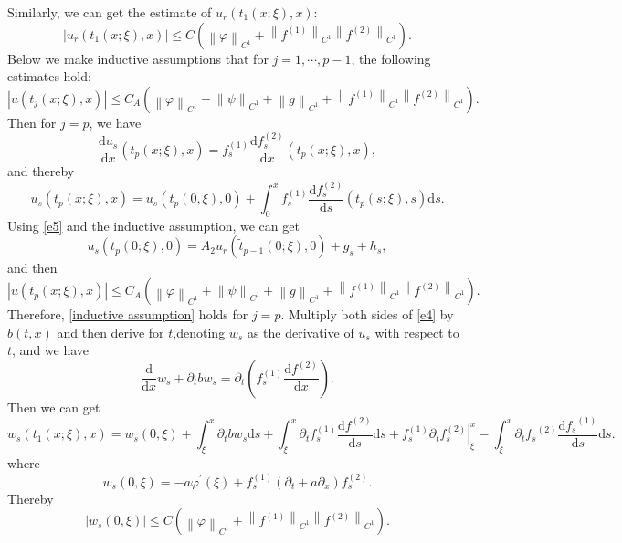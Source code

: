 \documentclass[a4paper,reqno,11pt]{amsart}
\numberwithin{equation}{section} %
\begin{document}
Similarly, we can get the estimate of $u_r\left( t_1(x;\xi ),x \right) $:
$$
\left| u_r\left( t_1(x;\xi ),x \right) \right|\leq C\left( \left\| \varphi \right\| _{C^1}+\left\| f^{(1)} \right\| _{C^1}\left\| f^{(2)} \right\| _{C^1} \right) .
$$
Below we make inductive assumptions that for $j=1,\cdots,p-1$, the following estimates hold:
\begin{equation}\label{inductive assumption}
\left| u\left( t_j(x;\xi ),x \right) \right|\leq C_A\left( \left\| \varphi \right\| _{C^1}+\left\| \psi \right\| _{C^1}+\left\| g \right\| _{C^1}+\left\| f^{(1)} \right\| _{C^1}\left\| f^{(2)} \right\| _{C^1} \right) .
\end{equation}
Then for $j=p$, we have
$$
\frac{\mathrm{d}u_s}{\mathrm{d}x}\left( t_p(x;\xi ),x \right) =f_{s}^{(1)}\frac{\mathrm{d}f_{s}^{(2)}}{\mathrm{d}x}\left( t_p(x;\xi ),x \right) ,
$$
and thereby
$$
u_s\left( t_p\left( x;\xi \right) ,x \right) =u_s(t_p(0,\xi ),0)+\int_{0}^x{f_{s}^{(1)}\frac{\mathrm{d}f_{s}^{(2)}}{\mathrm{d}s}\left( t_p\left( s;\xi \right) ,s \right) \mathrm{d}s}.
$$
Using \eqref{e5} and the inductive assumption, we can get
$$
u_s\left(t_p(0 ; \xi), 0\right)=A_2 u_r\left(\tilde{t}_{p-1}(0 ; \xi), 0\right)+g_s+h_s ,
$$
and then
$$
\left| u\left( t_p(x;\xi ),x \right) \right|\leq C_A\left( \left\| \varphi \right\| _{C^1}+\left\| \psi \right\| _{C^1}+\left\| g \right\| _{C^1}+\left\| f^{(1)} \right\| _{C^1}\left\| f^{(2)} \right\| _{C^1} \right) .
$$
Therefore, \eqref{inductive assumption} holds for $j=p$.
Multiply both sides of \eqref{e4} by $b(t,x)$ and then derive for $t$,denoting $w_s$ as the derivative of $u_s$ with respect to $t$, and we have
$$
\frac{\mathrm{d}}{\mathrm{d}x}w_s+\partial _tbw_s=\partial _t\left( f_{s}^{(1)}\frac{\mathrm{d}f^{(2)}}{\mathrm{d}x} \right). 
$$
Then we can get
\begin{equation}\label{e of w_s 1}
w_s\left( t_1(x;\xi ),x \right) =w_s(0,\xi )+\int_{\xi}^x{\partial _tbw_s\mathrm{d}s}+\int_{\xi}^x{\partial _tf_{s}^{(1)}\frac{\mathrm{d}f^{(2)}}{\mathrm{d}s}\mathrm{d}s}+\left. f_{s}^{(1)}\partial _tf_{s}^{(2)} \right|_{\xi}^{x}-\int_{\xi}^x{\partial _t{f_s}^{(2)}\frac{\mathrm{d}{f_s}^{(1)}}{\mathrm{d}s}\mathrm{d}s}.
\end{equation}
where
\begin{equation}\label{w_s at 0}
w_s(0, \xi)=-a \varphi^{\prime}(\xi)+f_s^{(1)}\left(\partial_t+a \partial_x\right) f_s^{(2)} .
\end{equation}
Thereby
$$
\left| w_s(0,\xi ) \right|\leq C\left( \left\| \varphi \right\| _{C^1}+\left\| f^{\left( 1 \right)} \right\| _{C^1}\left\| f^{(2)} \right\| _{C^1} \right) .
$$
\end{document}
